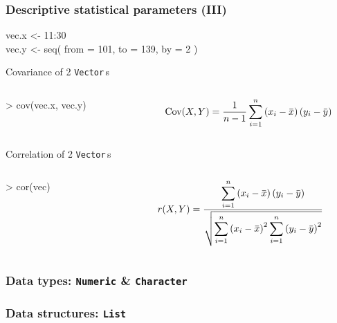 \documentclass[ucs]{beamer}
\newcommand{\overbar}[1]{\mkern 1.5mu\overline{\mkern-1.5mu#1\mkern-1.5mu}\mkern 1.5mu}
\begin{document}
\begin{frame}
  \frametitle{Descriptive statistical parameters (III)}
  \ttfamily
  vec.x <- 11:30\\
  vec.y <- seq( from = 101, to = 139, by = 2 ) \\

  \begin{block}{Covariance of 2 \texttt{Vector}\,s}
    \begin{columns}
      \begin{column}{0.4\textwidth}       
        \ttfamily > cov(vec.x, vec.y)
      \end{column}
        \begin{column}{0.6\textwidth}
      \scriptsize \rmfamily
      \[ 
    \text{Cov}(X,Y) = \frac{1}{n-1} \sum_{i=1}^{n}{\left(x_i - \overbar{x}\right)\left(y_i - \overbar{y}\right)  }
      \] 
    \end{column}
    \end{columns}
  
  \end{block}

\begin{block}{Correlation of 2 \texttt{Vector}\,s}
  \begin{columns}
    \begin{column}{0.4\textwidth}       
      \ttfamily > cor(vec)
    \end{column}
        \begin{column}{0.6\textwidth}
  \scriptsize
  \[ 
  r(X,Y) = \frac{\displaystyle
     \sum_{i=1}^{n}{\left(x_i - \overbar{x}\right)\left(y_i - \overbar{y}\right) }
  }{ \displaystyle
     \sqrt{ \sum_{i=1}^{n}{\left(x_i - \overbar{x}\right)^2}
            \sum_{i=1}^{n}{\left(y_i - \overbar{y}\right)^2}  }
  }
  \] 
\end{column}
\end{columns}
\end{block}


 \end{frame}



\begin{frame}
  \frametitle{Data types: \texttt{Numeric} \& \texttt{Character}}
     
\end{frame}


  \begin{frame}
    \frametitle{Data structures: \texttt{List}}
  \end{frame}
  
\end{document}
